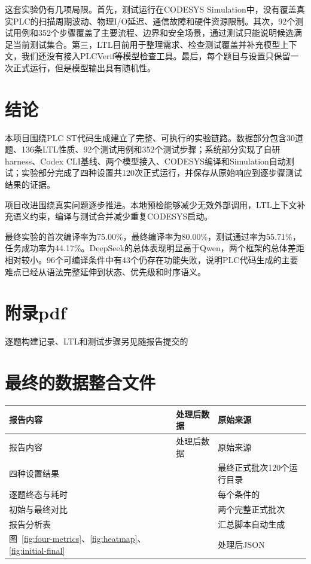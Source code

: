 \documentclass[UTF8,a4paper,zihao=-4]{ctexart}
\begin{document}
这套实验仍有几项局限。首先，测试运行在CODESYS Simulation中，没有覆盖真实PLC的扫描周期波动、物理I/O延迟、通信故障和硬件资源限制。其次，92个测试用例和352个步骤覆盖了主要流程、边界和安全场景，通过测试只能说明候选满足当前测试集合。第三，LTL目前用于整理需求、检查测试覆盖并补充模型上下文，我们还没有接入PLCVerif等模型检查工具。最后，每个题目与设置只保留一次正式运行，但是模型输出具有随机性。

\section{结论}
本项目围绕PLC ST代码生成建立了完整、可执行的实验链路。数据部分包含30道题、136条LTL性质、92个测试用例和352个测试步骤；系统部分实现了自研harness、Codex CLI基线、两个模型接入、CODESYS编译和Simulation自动测试；实验部分完成了四种设置共120次正式运行，并保存从原始响应到逐步骤测试结果的证据。


项目改进围绕真实问题逐步推进。本地预检能够减少无效外部调用，LTL上下文补充语义约束，编译与测试合并减少重复CODESYS启动。

最终实验的首次编译率为75.00\%，最终编译率为80.00\%，测试通过率为55.71\%，任务成功率为44.17\%。DeepSeek的总体表现明显高于Qwen，两个框架的总体差距相对较小。96个可编译条件中有43个仍存在功能失败，说明PLC代码生成的主要难点已经从语法完整延伸到状态、优先级和时序语义。

\newpage

\appendix
\section{附录pdf}
逐题构建记录、LTL和测试步骤另见随报告提交的

\section{最终的数据整合文件}
\begin{longtable}{L{4.0cm}L{5.3cm}L{4.0cm}}
  \toprule
  报告内容 & 处理后数据 & 原始来源\\
  \midrule
  \endfirsthead
  \toprule
  报告内容 & 处理后数据 & 原始来源\\
  \midrule
  \endhead
  四种设置结果 &  & 最终正式批次120个运行目录\\
  逐题终态与耗时 &  & 每个条件的\\
  初始与最终对比 &  & 两个完整正式批次\\
  报告分析表 &  & 汇总脚本自动生成\\
  图~\ref{fig:four-metrics}、\ref{fig:heatmap}、\ref{fig:initial-final} &  & 处理后JSON\\
  \bottomrule
\end{longtable}
\end{document}
